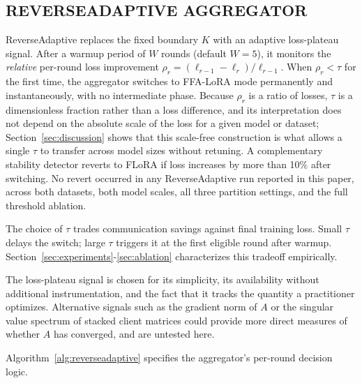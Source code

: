 \subsection{REVERSEADAPTIVE AGGREGATOR}
ReverseAdaptive replaces the fixed boundary $K$ with an adaptive loss-plateau signal. After a warmup period of $W$ rounds (default $W{=}5$), it monitors the \emph{relative} per-round loss improvement $\rho_r = (\ell_{r-1} - \ell_r) / \ell_{r-1}$. When $\rho_r < \tau$ for the first time, the aggregator switches to FFA-LoRA \cite{sun2024ffalora} mode permanently and instantaneously, with no intermediate phase. Because $\rho_r$ is a ratio of losses, $\tau$ is a dimensionless fraction rather than a loss difference, and its interpretation does not depend on the absolute scale of the loss for a given model or dataset; Section~\ref{sec:discussion} shows that this scale-free construction is what allows a single $\tau$ to transfer across model sizes without retuning. A complementary stability detector reverts to FLoRA if loss increases by more than 10\% after switching. No revert occurred in any ReverseAdaptive run reported in this paper, across both datasets, both model scales, all three partition settings, and the full threshold ablation.

The choice of $\tau$ trades communication savings against final training loss. Small $\tau$ delays the switch; large $\tau$ triggers it at the first eligible round after warmup. Section~\ref{sec:experiments}-\ref{sec:ablation} characterizes this tradeoff empirically.

The loss-plateau signal is chosen for its simplicity, its availability without additional instrumentation, and the fact that it tracks the quantity a practitioner optimizes. Alternative signals such as the gradient norm of $A$ or the singular value spectrum of stacked client matrices could provide more direct measures of whether $A$ has converged, and are untested here.

Algorithm~\ref{alg:reverseadaptive} specifies the aggregator's per-round decision logic.

